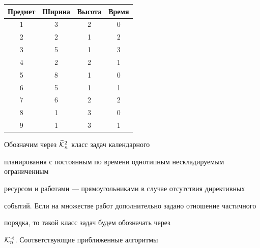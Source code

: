 \begin{center}




\begin{tabular}{|c|c|c|c|}


\hline


Предмет & Ширина & Высота & Время\\


\hline


1 & 3 & 2 & 0\\ \hline


2 & 2 & 1 & 2\\ \hline


3 & 5 & 1 & 3\\ \hline


4 & 2 & 2 & 1\\ \hline


5 & 8 & 1 & 0\\ \hline


6 & 5 & 1 & 1\\ \hline


7 & 6 & 2 & 2\\ \hline


8 & 1 & 3 & 0\\ \hline


9 & 1 & 3 & 1\\ \hline


\end{tabular}


\end{center}


\label{tab1}




\medskip





Обозначим через $\widetilde {\cal K}_{n}^{2}$ класс задач календарного 


планирования с постоянным по времени однотипным нескладируемым ограниченным 


ресурсом и работами --- прямоугольниками в случае отсутствия директивных 


событий. Если на множестве работ дополнительно задано отношение частичного


порядка, то такой класс задач будем обозначать через 


${\cal K}_{n}^{\prec}$. Соответствующие приближенные алгоритмы


